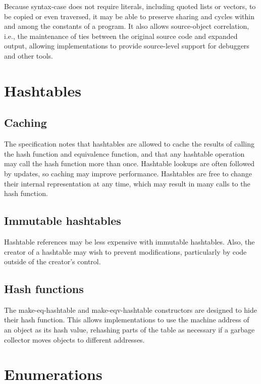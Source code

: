 \documentclass[twoside,twocolumn]{algol60}
\begin{document}
Because {\cf syntax-case} does not require literals, including quoted
lists or vectors, to be copied or even traversed, it may be able to preserve sharing
and cycles within and among the constants of a program.  It also
allows source-object correlation, i.e., the maintenance of ties
between the original source code and expanded output, allowing
implementations to provide source-level support for debuggers and
other tools.

\chapter{Hashtables}

\section{Caching}

The specification notes that hashtables are allowed to cache the
results of calling the hash function and equivalence function, and
that any hashtable operation may call the hash function more than
once.  Hashtable lookups are often followed by updates, so caching may
improve performance.  Hashtables are free to change their internal
representation at any time, which may result in many calls to the hash
function.

\section{Immutable hashtables}

Hashtable references may be less expensive with immutable hashtables.
Also, the creator of a hashtable may wish to prevent 
modifications, particularly by code outside of the creator's 
control.

\section{Hash functions}

The {\cf make-eq-hashtable} and {\cf make-eqv-hashtable} constructors
are designed to hide their hash function.  This allows implementations
to use the machine address of an object as its hash value, rehashing
parts of the table as necessary if a garbage collector moves
objects to different addresses.

\chapter{Enumerations}
\end{document}
